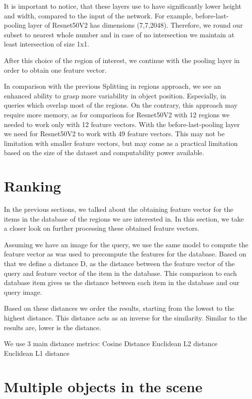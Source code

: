 It is important to notice, that these layers use to have significantly lower height and width, compared to the input of the network. For example, before-last-pooling layer of Resnet50V2 has dimensions (7,7,2048). Therefore, we round our subset to nearest whole number and in case of no intersection we maintain at least intersection of size 1x1.

After this choice of the region of interest, we continue with the pooling layer in order to obtain one feature vector.

In comparison with the previous Splitting in regions approach, we see an enhanced ability to grasp more variability in object position. Especially, in queries which overlap most of the regions. On the contrary, this approach may require more memory, as for comparison for Resnet50V2 with 12 regions we needed to work only with 12 feature vectors. With the before-last-pooling layer we need for Resnet50V2 to work with 49 feature vectors. This may not be limitation with smaller feature vectors, but may come as a practical limitation based on the size of the dataset and computability power available.


\section{Ranking}
In the previous sections, we talked about the obtaining feature vector for the items in the database of the regions we are interested in. In this section, we take a closer look on further processing these obtained feature vectors.

Assuming we have an image for the query, we use the same model to compute the feature vector as was used to precompute the features for the database. Based on that we define a distance D, as the distance between the feature vector of the query and feature vector of the item in the database. This comparison to each database item gives us the distance between each item in the database and our query image.

Based on these distances we order the results, starting from the lowest to the highest distance. This distance acts as an inverse for the similarity. Similar to the results are, lower is the distance.

We use 3 main distance metrics:
Cosine Distance
Euclidean L2 distance
Euclidean L1 distance

\section{Multiple objects in the scene}

